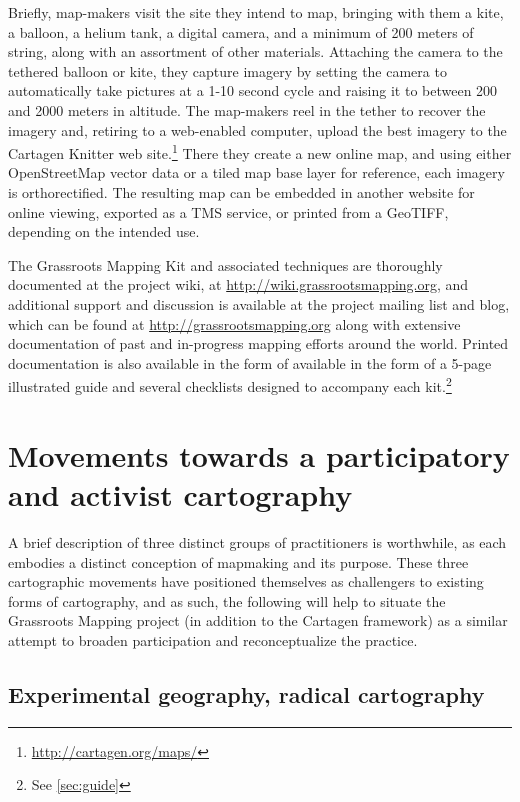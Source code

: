 \documentclass[11pt,oneside,notitlepage]{report}
\begin{document}
Briefly, map-makers visit the site they intend to map, bringing with them a kite, a balloon, a helium tank, a digital camera, and a minimum of 200 meters of string, along with an assortment of other materials. Attaching the camera to the tethered balloon or kite, they capture imagery by setting the camera to automatically take pictures at a 1-10 second cycle and raising it to between 200 and 2000 meters in altitude. The map-makers reel in the tether to recover the imagery and, retiring to a web-enabled computer, upload the best imagery to the Cartagen Knitter web site.\footnote{\url{http://cartagen.org/maps/}} There they create a new online map, and using either OpenStreetMap vector data or a tiled map base layer for reference, each imagery is orthorectified. The resulting map can be embedded in another website for online viewing, exported as a \ac{TMS} service, or printed from a \ac{GeoTIFF}, depending on the intended use. 

The Grassroots Mapping Kit and associated techniques are thoroughly documented at the project wiki, at \url{http://wiki.grassrootsmapping.org}, and additional support and discussion is available at the project mailing list and blog, which can be found at \url{http://grassrootsmapping.org} along with extensive documentation of past and in-progress mapping efforts around the world. Printed documentation is also available in the form of available in the form of a 5-page illustrated guide and several checklists designed to accompany each kit.\footnote{See \ref{sec:guide}}

\chapter{Movements towards a participatory and activist cartography}

A brief description of three distinct groups of practitioners is worthwhile, as each embodies a distinct conception of mapmaking and its purpose. These three cartographic movements have positioned themselves as challengers to existing forms of cartography, and as such, the following will help to situate the Grassroots Mapping project (in addition to the Cartagen framework) as a similar attempt to broaden participation and reconceptualize the practice. 

\section{Experimental geography, radical cartography}
\end{document}
